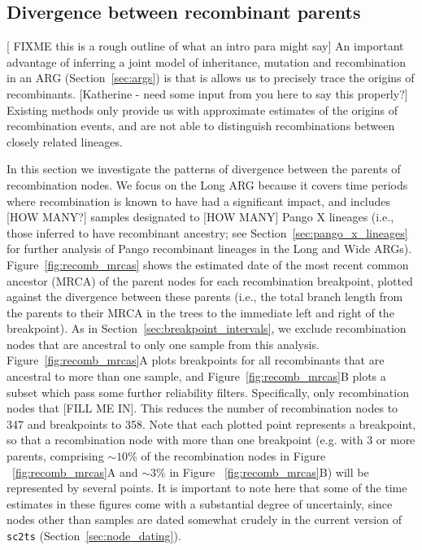 \documentclass{article}
\begin{document}
\subsection{Divergence between recombinant parents}
\label{sec:parent_divergence}

[ FIXME this is a rough outline of what an intro para might say]
An important advantage of inferring a joint model of inheritance,
mutation and recombination in an ARG (Section~\ref{sec:args})
is that is allows us to precisely trace the origins of recombinants.
[Katherine - need some input from you here to say this properly?]
Existing methods only provide us with approximate estimates of
the origins of recombination events, and are not able to distinguish
recombinations between closely related lineages.

In this section we investigate the patterns of divergence between
the parents of recombination nodes.
We focus on the Long ARG because  it covers time
periods where recombination is known to have had a significant
impact, and includes
[HOW MANY?]
samples designated to [HOW MANY] Pango X lineages (i.e., those inferred
to have recombinant ancestry; see Section~\ref{sec:pango_x_lineages} for
further analysis of Pango recombinant lineages in the Long and Wide ARGs).
Figure~\ref{fig:recomb_mrcas} shows the estimated date of the most recent
common ancestor (MRCA) of the parent nodes for each recombination breakpoint,
plotted against the divergence between these parents (i.e., the
total branch length from the parents to their MRCA in the trees to
the immediate left and right of the breakpoint).
As in Section~\ref{sec:breakpoint_intervals}, we exclude recombination nodes
that are ancestral to only one sample from this analysis.
Figure~\ref{fig:recomb_mrcas}A plots breakpoints for all recombinants that
are ancestral to more than one sample, and
Figure~\ref{fig:recomb_mrcas}B plots a subset which pass some further
reliability filters. Specifically, only recombination nodes that
[FILL ME IN].
This reduces the number of recombination nodes
to 347 and breakpoints to 358.
Note that each plotted point
represents a breakpoint, so that a recombination node with more than one
breakpoint (e.g. with 3 or more parents, comprising ${\sim}10 \%$ of the
recombination nodes in Figure ~\ref{fig:recomb_mrcas}A and ${\sim}3 \%$ in
Figure ~\ref{fig:recomb_mrcas}B) will be represented by several points.
It is important to note here that some of the time estimates in these figures
come with a substantial degree of uncertainly,
since nodes other than samples are dated somewhat crudely in the current version
of \texttt{sc2ts} (Section~\ref{sec:node_dating}).
\end{document}
